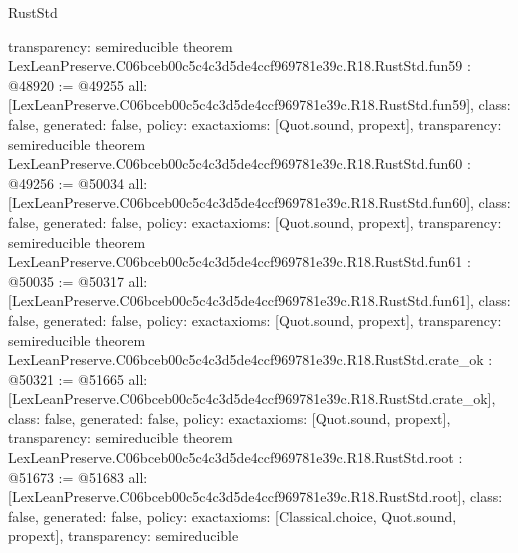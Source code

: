 \begin{lexlean}{RustStd}
\begin{coremodule}
{  transparency: semireducible
}
theorem LexLeanPreserve.C06bceb00c5c4c3d5de4ccf969781e39c.R18.RustStd.fun59 : @48920 := @49255 {
  all: [LexLeanPreserve.C06bceb00c5c4c3d5de4ccf969781e39c.R18.RustStd.fun59],
  class: false,
  generated: false,
  policy: exact{axioms: [Quot.sound, propext]},
  transparency: semireducible
}
theorem LexLeanPreserve.C06bceb00c5c4c3d5de4ccf969781e39c.R18.RustStd.fun60 : @49256 := @50034 {
  all: [LexLeanPreserve.C06bceb00c5c4c3d5de4ccf969781e39c.R18.RustStd.fun60],
  class: false,
  generated: false,
  policy: exact{axioms: [Quot.sound, propext]},
  transparency: semireducible
}
theorem LexLeanPreserve.C06bceb00c5c4c3d5de4ccf969781e39c.R18.RustStd.fun61 : @50035 := @50317 {
  all: [LexLeanPreserve.C06bceb00c5c4c3d5de4ccf969781e39c.R18.RustStd.fun61],
  class: false,
  generated: false,
  policy: exact{axioms: [Quot.sound, propext]},
  transparency: semireducible
}
theorem LexLeanPreserve.C06bceb00c5c4c3d5de4ccf969781e39c.R18.RustStd.crate_ok : @50321 := @51665 {
  all: [LexLeanPreserve.C06bceb00c5c4c3d5de4ccf969781e39c.R18.RustStd.crate_ok],
  class: false,
  generated: false,
  policy: exact{axioms: [Quot.sound, propext]},
  transparency: semireducible
}
theorem LexLeanPreserve.C06bceb00c5c4c3d5de4ccf969781e39c.R18.RustStd.root : @51673 := @51683 {
  all: [LexLeanPreserve.C06bceb00c5c4c3d5de4ccf969781e39c.R18.RustStd.root],
  class: false,
  generated: false,
  policy: exact{axioms: [Classical.choice, Quot.sound, propext]},
  transparency: semireducible
}


\end{coremodule}
\end{lexlean}
